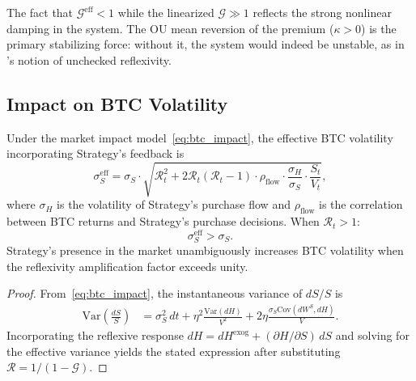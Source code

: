 \begin{remark}
The fact that $\mathcal{G}^{\mathrm{eff}} < 1$ while the linearized
$\mathcal{G} \gg 1$ reflects the strong nonlinear damping in the system.
The OU mean reversion of the premium ($\kappa > 0$) is the primary
stabilizing force: without it, the system would indeed be unstable,
as in \citet{soros1987alchemy}'s notion of unchecked reflexivity.
\end{remark}

\subsection{Impact on BTC Volatility}\label{subsec:vol_impact}

\begin{proposition}\label{prop:vol_amp}
Under the market impact model~\eqref{eq:btc_impact}, the effective BTC
volatility incorporating Strategy's feedback is
\begin{equation}\label{eq:vol_amplified}
  \sigma_S^{\mathrm{eff}}
  = \sigma_S \cdot \sqrt{\mathcal{R}_t^2
    + 2\mathcal{R}_t(\mathcal{R}_t - 1)
    \cdot \rho_{\mathrm{flow}} \cdot \frac{\sigma_H}{\sigma_S}
    \cdot \frac{S_t}{V_t}},
\end{equation}
where $\sigma_H$ is the volatility of Strategy's purchase flow and
$\rho_{\mathrm{flow}}$ is the correlation between BTC returns and
Strategy's purchase decisions.  When $\mathcal{R}_t > 1$:
\begin{equation}\label{eq:vol_increase}
  \sigma_S^{\mathrm{eff}} > \sigma_S.
\end{equation}
Strategy's presence in the market unambiguously increases BTC volatility
when the reflexivity amplification factor exceeds unity.
\end{proposition}

\begin{proof}
From~\eqref{eq:btc_impact}, the instantaneous variance of $dS/S$ is
\begin{align*}
  \mathrm{Var}\!\left(\frac{dS}{S}\right)
  &= \sigma_S^2\,dt
    + \eta^2 \frac{\mathrm{Var}(dH)}{V^2}
    + 2\eta \frac{\sigma_S \mathrm{Cov}(dW^S, dH)}{V}.
\end{align*}
Incorporating the reflexive response $dH = dH^{\mathrm{exog}}
+ (\partial H/\partial S)\, dS$ and solving for the effective variance
yields the stated expression after substituting
$\mathcal{R} = 1/(1-\mathcal{G})$.
\end{proof}

